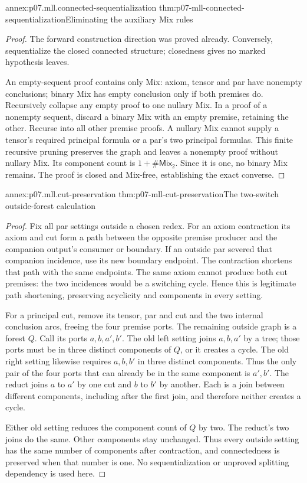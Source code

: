 \begin{annexitem}{annex:p07.mll.connected-sequentialization}
 {thm:p07-mll-connected-sequentialization}{Eliminating the auxiliary Mix rules}
\begin{proof}
The forward construction direction was proved already. Conversely,
sequentialize the closed connected structure; closedness gives no
marked hypothesis leaves.

An empty-sequent proof contains only Mix: axiom, tensor and par have
nonempty conclusions; binary Mix has empty conclusion only if both
premises do. Recursively collapse any empty proof to one nullary Mix.
In a proof of a nonempty sequent, discard a binary Mix with an empty
premise, retaining the other. Recurse into all other premise proofs.
A nullary Mix cannot supply a tensor's required principal formula or
a par's two principal formulas. This finite recursive pruning preserves
the graph and leaves a nonempty proof without nullary Mix.
Its component count is \(1+\#\mathsf{Mix}_2\).
Since it is one, no binary Mix remains. The proof is closed and
Mix-free, establishing the exact converse.
\end{proof}
\end{annexitem}

\begin{annexitem}{annex:p07.mll.cut-preservation}
 {thm:p07-mll-cut-preservation}{The two-switch outside-forest calculation}
\begin{proof}
Fix all par settings outside a chosen redex.
For an axiom contraction its axiom and cut form a path between the
opposite premise producer and the companion output's consumer or
boundary. If an outside par severed that companion incidence, use
its new boundary endpoint. The contraction shortens that path with
the same endpoints. The same axiom cannot produce both cut premises:
the two incidences would be a switching cycle. Hence this is legitimate
path shortening, preserving acyclicity and components in every setting.

For a principal cut, remove its tensor, par and cut and the two internal
conclusion arcs, freeing the four premise ports. The remaining outside
graph is a forest \(Q\). Call its ports \(a,b,a',b'\).
The old left setting joins \(a,b,a'\) by a tree; those ports must be
in three distinct components of \(Q\), or it creates a cycle.
The old right setting likewise requires \(a,b,b'\) in three distinct
components. Thus the only pair of the four ports that can already be
in the same component is \(a',b'\).
The reduct joins \(a\) to \(a'\) by one cut and \(b\) to \(b'\) by
another. Each is a join between different components, including after
the first join, and therefore neither creates a cycle.

Either old setting reduces the component count of \(Q\) by two.
The reduct's two joins do the same. Other components stay unchanged.
Thus every outside setting has the same number of components after
contraction, and connectedness is preserved when that number is one.
No sequentialization or unproved splitting dependency is used here.
\end{proof}
\end{annexitem}

